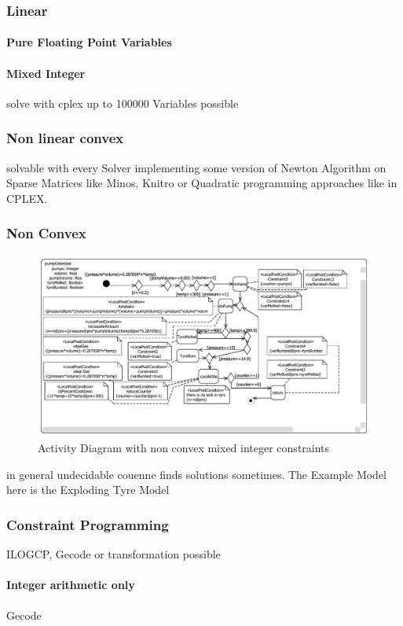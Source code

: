 \subsubsection{Linear}
\paragraph{Pure Floating Point Variables}
\paragraph{Mixed Integer}
solve with cplex up to 100000 Variables possible
\subsubsection{Non linear convex}
solvable with every Solver implementing some version of Newton Algorithm on Sparse Matrices like Minos, Knitro or Quadratic programming approaches like in CPLEX.
\subsubsection{Non Convex}
\label{sec:exampleModelNonConvex}
\begin{figure}
\label{fig:pumpTyre}
\includegraphics[width=\textwidth]{./pics/pumpTyre.pdf}
\caption{Activity Diagram with non convex mixed integer constraints}
\end{figure}
in general undecidable couenne finds solutions sometimes.
The Example Model here is the Exploding Tyre Model
\subsubsection{Constraint Programming}
ILOGCP, Gecode or transformation possible
\paragraph{Integer arithmetic only} Gecode
